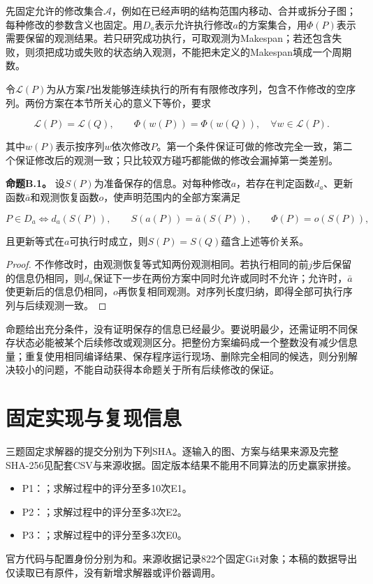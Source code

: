 \documentclass[anonymous,notoc]{gmcm2026}
\begin{document}
先固定允许的修改集合\(\mathcal A\)，例如在已经声明的结构范围内移动、合并或拆分子图；每种修改的参数含义也固定。用\(D_a\)表示允许执行修改\(a\)的方案集合，用\(\Phi(P)\)表示需要保留的观测结果。若只研究成功执行，可取观测为Makespan；若还包含失败，则须把成功或失败的状态纳入观测，不能把未定义的Makespan填成一个周期数。

令\(\mathcal L(P)\)为从方案\(P\)出发能够连续执行的所有有限修改序列，包含不作修改的空序列。两份方案在本节所关心的意义下等价，要求

\[\mathcal L(P)=\mathcal L(Q),\qquad \Phi(w(P))=\Phi(w(Q)),\quad\forall w\in\mathcal L(P).\]

其中\(w(P)\)表示按序列\(w\)依次修改\(P\)。第一个条件保证可做的修改完全一致，第二个保证修改后的观测一致；只比较双方碰巧都能做的修改会漏掉第一类差别。

\textbf{命题B.1。} 设\(S(P)\)为准备保存的信息。对每种修改\(a\)，若存在判定函数\(d_a\)、更新函数\(\bar a\)和观测恢复函数\(o\)，使声明范围内的全部方案满足

\[P\in D_a\iff d_a(S(P)),\qquad S(a(P))=\bar a(S(P)),\qquad\Phi(P)=o(S(P)),\]

且更新等式在\(a\)可执行时成立，则\(S(P)=S(Q)\)蕴含上述等价关系。

\begin{proof} 不作修改时，由观测恢复等式知两份观测相同。若执行相同的前\(j\)步后保留的信息仍相同，则\(d_a\)保证下一步在两份方案中同时允许或同时不允许；允许时，\(\bar a\)使更新后的信息仍相同，\(o\)再恢复相同观测。对序列长度归纳，即得全部可执行序列与后续观测一致。\end{proof}

命题给出充分条件，没有证明保存的信息已经最少。要说明最少，还需证明不同保存状态必能被某个后续修改或观测区分。把整份方案编码成一个整数没有减少信息量；重复使用相同编译结果、保存程序运行现场、删除完全相同的候选，则分别解决较小的问题，不能自动获得本命题关于所有后续修改的保证。

\section{固定实现与复现信息}
三题固定求解器的提交分别为下列SHA。逐输入的图、方案与结果来源及完整SHA-256见配套CSV与来源收据。固定版本结果不能用不同算法的历史赢家拼接。
\begin{itemize}
\item P1：\texttt{}；求解过程中的评分至多10次E1。
\item P2：\texttt{}；求解过程中的评分至多3次E2。
\item P3：\texttt{}；求解过程中的评分至多3次E0。
\end{itemize}
官方代码与配置身份分别为\texttt{}和\texttt{}。来源收据记录822个固定Git对象；本稿的数据导出仅读取已有原件，没有新增求解器或评价器调用。
\end{document}
